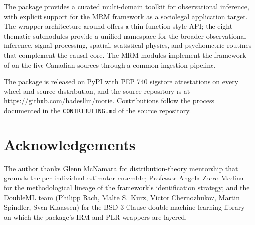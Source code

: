 \documentclass[article,shortnames,nojss]{jss}
\begin{document}
The  package  provides a curated
multi-domain toolkit for observational inference, with explicit
support for the MRM framework as a sociolegal application target.
The wrapper architecture around  offers a thin
function-style API; the eight thematic submodules provide a
unified namespace for the broader observational-inference,
signal-processing, spatial, statistical-physics, and psychometric
routines that complement the causal core. The MRM modules
implement the framework of \citet{Ruhela2026MRM} on the five
Canadian sources through a common ingestion pipeline.

The package is released on PyPI with PEP 740 sigstore
attestations on every wheel and source distribution, and the
source repository is at \url{https://github.com/hadesllm/morie}.
Contributions follow the process documented in the
\texttt{CONTRIBUTING.md} of the source repository.

\section*{Acknowledgements}

The author thanks Glenn McNamara for distribution-theory
mentorship that grounds the per-individual estimator ensemble;
Professor Angela Zorro Medina for the methodological lineage of
the framework's identification strategy; and the DoubleML team
(Philipp Bach, Malte S.\ Kurz, Victor Chernozhukov, Martin
Spindler, Sven Klaassen) for the BSD-3-Clause
double-machine-learning library on which the package's IRM and
PLR wrappers are layered.


\end{document}
